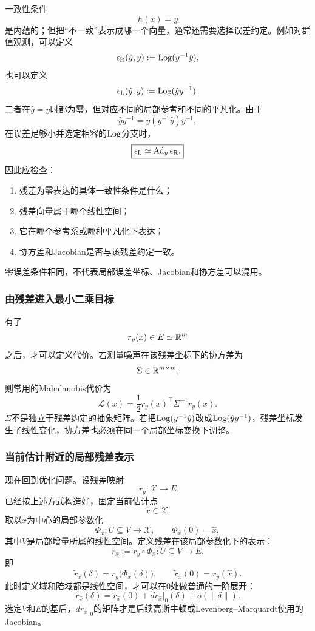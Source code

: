 一致性条件
\[
    h(x)=y
\]
是内蕴的；但把“不一致”表示成哪一个向量，通常还需要选择误差约定。例如对群值观测，可以定义
\[
    \epsilon_{\mathrm R}(\hat y,y)
    :=
    \operatorname{Log}(y^{-1}\hat y),
\]
也可以定义
\[
    \epsilon_{\mathrm L}(\hat y,y)
    :=
    \operatorname{Log}(\hat y y^{-1}).
\]
二者在$\hat y=y$时都为零，但对应不同的局部参考和不同的平凡化。由于
\[
    \hat y y^{-1}
    =
    y(y^{-1}\hat y)y^{-1},
\]
在误差足够小并选定相容的$\operatorname{Log}$分支时，
\[
    \boxed{
    \epsilon_{\mathrm L}
    \simeq
    \operatorname{Ad}_y\epsilon_{\mathrm R}.
    }
\]
因此应检查：
\begin{enumerate}
    \item 残差为零表达的具体一致性条件是什么；
    \item 残差向量属于哪个线性空间；
    \item 它在哪个参考系或哪种平凡化下表达；
    \item 协方差和Jacobian是否与该残差约定一致。
\end{enumerate}
零误差条件相同，不代表局部误差坐标、Jacobian和协方差可以混用。

\subsubsection*{由残差进入最小二乘目标}

有了
\[
    r_y(x)\in E\simeq\mathbb{R}^m
\]
之后，才可以定义代价。若测量噪声在该残差坐标下的协方差为
\[
    \Sigma\in\mathbb{R}^{m\times m},
\]
则常用的Mahalanobis代价为
\[
    \boxed{
    \mathcal L(x)
    =
    \frac12r_y(x)^\top\Sigma^{-1}r_y(x).
    }
\]
$\Sigma$不是独立于残差约定的抽象矩阵。若把$\operatorname{Log}(y^{-1}\hat y)$改成$\operatorname{Log}(\hat y y^{-1})$，残差坐标发生了线性变化，协方差也必须在同一个局部坐标变换下调整。

\subsubsection*{当前估计附近的局部残差表示}

现在回到优化问题。设残差映射
\[
    r_y:\mathcal X\to E
\]
已经按上述方式构造好，固定当前估计点
\[
    \hat x\in\mathcal X.
\]
取以$\hat x$为中心的局部参数化
\[
    \Phi_{\hat x}:U\subseteq V\to\mathcal X,
    \qquad
    \Phi_{\hat x}(0)=\hat x,
\]
其中$V$是局部增量所属的线性空间。定义残差在该局部参数化下的表示：
\[
    \boxed{
    \widetilde r_{\hat x}
    :=
    r_y\circ\Phi_{\hat x}
    :
    U\subseteq V\to E.
    }
\]
即
\[
    \widetilde r_{\hat x}(\delta)
    =
    r_y\bigl(\Phi_{\hat x}(\delta)\bigr),
    \qquad
    \widetilde r_{\hat x}(0)=r_y(\hat x).
\]
此时定义域和陪域都是线性空间，才可以在$0$处做普通的一阶展开：
\[
    \boxed{
    \widetilde r_{\hat x}(\delta)
    =
    \widetilde r_{\hat x}(0)
    +
    d\widetilde r_{\hat x}\big|_0(\delta)
    +
    o(\|\delta\|).
    }
\]
选定$V$和$E$的基后，$d\widetilde r_{\hat x}|_0$的矩阵才是后续高斯牛顿或Levenberg--Marquardt使用的Jacobian。


